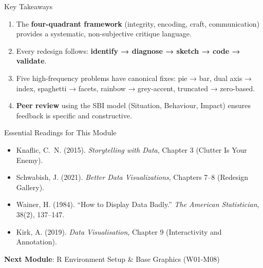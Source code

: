 \documentclass[10pt]{beamer}
\begin{document}
\begin{frame}{Key Takeaways}
  \begin{enumerate}
    \item The \textbf{four-quadrant framework} (integrity, encoding, craft,
          communication) provides a systematic, non-subjective critique
          language.
    \item Every redesign follows: \textbf{identify → diagnose → sketch →
          code → validate}.
    \item Five high-frequency problems have canonical fixes: pie → bar,
          dual axis → index, spaghetti → facets, rainbow → grey-accent,
          truncated → zero-based.
    \item \textbf{Peer review} using the SBI model (Situation, Behaviour,
          Impact) ensures feedback is specific and constructive.
  \end{enumerate}
\end{frame}

\begin{frame}{Essential Readings for This Module}
  \begin{itemize}
    \item Knaflic, C.~N. (2015). \emph{Storytelling with Data},
          Chapter 3 (Clutter Is Your Enemy).
    \item Schwabish, J. (2021). \emph{Better Data Visualizations},
          Chapters 7--8 (Redesign Gallery).
    \item Wainer, H. (1984). ``How to Display Data Badly.''
          \emph{The American Statistician}, 38(2), 137--147.
    \item Kirk, A. (2019). \emph{Data Visualisation}, Chapter 9
          (Interactivity and Annotation).
  \end{itemize}

  \vspace{6pt}
  \textbf{Next Module}: R Environment Setup \& Base Graphics (W01-M08)
\end{frame}
\end{document}
